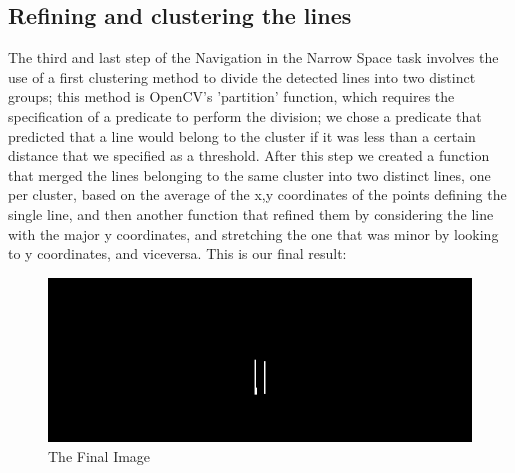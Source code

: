 \subsection{Refining and clustering the lines}
The third and last step of the Navigation in the Narrow Space task involves the use of a first clustering method to divide the detected lines into two distinct groups; this method is OpenCV's 'partition' function, which requires the specification of a predicate to perform the division; we chose a predicate that predicted that a line would belong to the cluster if it was less than a certain distance that we specified as a threshold. 
After this step we created a function that merged the lines belonging to the same cluster into two distinct lines, one per cluster, based on the average of the x,y coordinates of the points defining the single line, and then another function that refined them by considering the line with the major y coordinates, and stretching the one that was minor by looking to y coordinates, and viceversa. 
This is our final result:
\begin{center}
        \begin{figure}[H]
            \begin{minipage}{1.0\textwidth}
                \centering
                    \includegraphics[scale=0.70]{images/narrowSpace/finalImage.png}
                \caption{The Final Image}
            \end{minipage}
        \end{figure}            
\end{center}